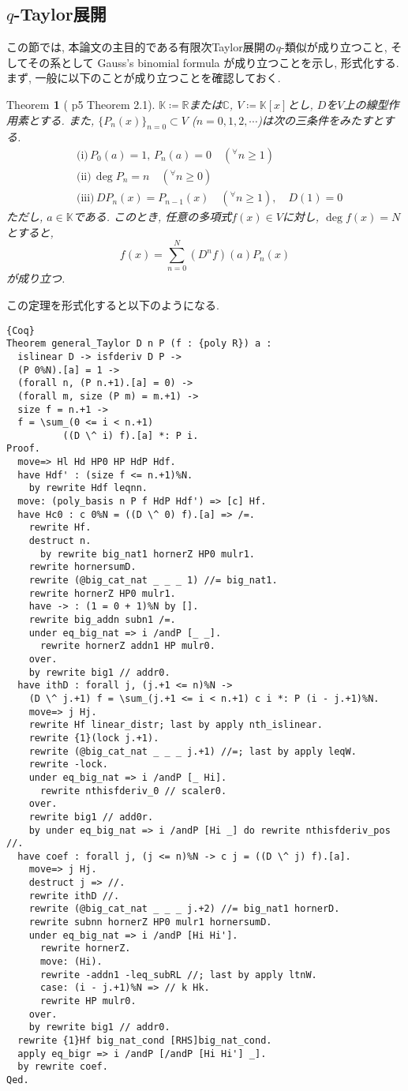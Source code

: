 \documentclass[11pt]{jsreport}
\theoremstyle{mystyle}
\newtheorem{thm}[df]{$\textrm{Theorem}$}
\newcommand{\bthm}{\begin{shadebox} \begin{thm}}
\newcommand{\ethm}{\end{thm} \end{shadebox}}
\newcommand{\R}{\mathbb{R}}
\newcommand{\C}{\mathbb{C}}
\newcommand{\K}{\mathbb{K}}
\newcommand{\0}{\textbf{0}}
\begin{document}
\subsection{$q$-Taylor展開} \label{ssec q_Taylor}
この節では, 本論文の主目的である有限次Taylor展開の$q$-類似が成り立つこと, そしてその系として Gauss's binomial formula が成り立つことを示し, 形式化する. 
まず, 一般に以下のことが成り立つことを確認しておく. 
\bthm[\cite{Kac} p5 Theorem 2.1] \label{general_Taylor}
$\K\coloneqq\R$または$\C$, $V\coloneqq\K[x]$とし, $D$を$V$上の線型作用素とする. また, 
$\{P_n(x)\}_{n=0}\subset V$ ($n=0,1,2,\cdots$)は次の三条件をみたすとする. 
  \begin{align*}
    &\textrm{(i)}\,P_0(a) = 1,\,P_n(a)=0 \quad ({}^{\forall}n\ge1)\\
    &\textrm{(ii)}\,\deg P_n = n \quad ({}^{\forall}n\ge0)\\
    &\textrm{(iii)}\,DP_n(x) = P_{n-1}(x) \quad ({}^{\forall}n\ge1), \quad D(1) = 0
  \end{align*}
ただし, $a\in\K$である. このとき, 任意の多項式$f(x)\in V$に対し, $\deg f(x)=N$とすると, 
  \[
    f(x) = \sum_{n=0}^N(D^nf)(a)P_n(x)
  \]
が成り立つ. 
\ethm
この定理を形式化すると以下のようになる. 
\begin{lstlisting}{Coq}
Theorem general_Taylor D n P (f : {poly R}) a :
  islinear D -> isfderiv D P ->
  (P 0%N).[a] = 1 ->
  (forall n, (P n.+1).[a] = 0) ->
  (forall m, size (P m) = m.+1) ->
  size f = n.+1 ->
  f = \sum_(0 <= i < n.+1)
          ((D \^ i) f).[a] *: P i. 
Proof.
  move=> Hl Hd HP0 HP HdP Hdf.
  have Hdf' : (size f <= n.+1)%N.
    by rewrite Hdf leqnn.
  move: (poly_basis n P f HdP Hdf') => [c] Hf.
  have Hc0 : c 0%N = ((D \^ 0) f).[a] => /=.
    rewrite Hf.
    destruct n.
      by rewrite big_nat1 hornerZ HP0 mulr1.
    rewrite hornersumD.
    rewrite (@big_cat_nat _ _ _ 1) //= big_nat1.
    rewrite hornerZ HP0 mulr1.
    have -> : (1 = 0 + 1)%N by [].
    rewrite big_addn subn1 /=.
    under eq_big_nat => i /andP [_ _].
      rewrite hornerZ addn1 HP mulr0.
    over.
    by rewrite big1 // addr0.
  have ithD : forall j, (j.+1 <= n)%N ->
    (D \^ j.+1) f = \sum_(j.+1 <= i < n.+1) c i *: P (i - j.+1)%N.
    move=> j Hj.
    rewrite Hf linear_distr; last by apply nth_islinear.
    rewrite {1}(lock j.+1).
    rewrite (@big_cat_nat _ _ _ j.+1) //=; last by apply leqW.
    rewrite -lock.
    under eq_big_nat => i /andP [_ Hi].
      rewrite nthisfderiv_0 // scaler0.
    over.
    rewrite big1 // add0r.
    by under eq_big_nat => i /andP [Hi _] do rewrite nthisfderiv_pos //.
  have coef : forall j, (j <= n)%N -> c j = ((D \^ j) f).[a].
    move=> j Hj.
    destruct j => //.
    rewrite ithD //.
    rewrite (@big_cat_nat _ _ _ j.+2) //= big_nat1 hornerD.
    rewrite subnn hornerZ HP0 mulr1 hornersumD.
    under eq_big_nat => i /andP [Hi Hi'].
      rewrite hornerZ.
      move: (Hi).
      rewrite -addn1 -leq_subRL //; last by apply ltnW.
      case: (i - j.+1)%N => // k Hk.
      rewrite HP mulr0.
    over.
    by rewrite big1 // addr0.
  rewrite {1}Hf big_nat_cond [RHS]big_nat_cond.
  apply eq_bigr => i /andP [/andP [Hi Hi'] _].
  by rewrite coef.
Qed.\end{lstlisting}
\end{document}
